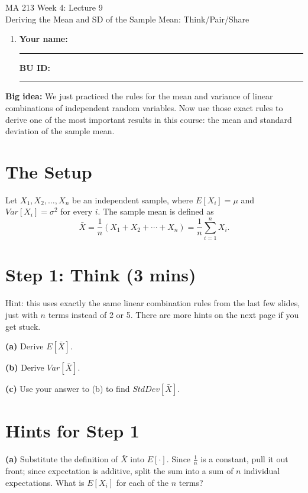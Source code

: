 \documentclass{article}
\newcommand{\coursenumber}{MA 213}
\newcommand{\weekplaceholder}{4}
\newcommand{\lectureplaceholder}{9}
\newcommand{\lecturetitle}{Deriving the Mean and SD of the Sample Mean: Think/Pair/Share}
\newcommand{\nameblank}{\rule{1.75in}{0.4pt}}
\newcommand{\idblank}{\rule{1.55in}{0.4pt}}
\begin{document}
\begin{center}
  {\LARGE \coursenumber{} Week \weekplaceholder{}: Lecture \lectureplaceholder{}}\\
  {\large \lecturetitle{}}
\end{center}

\begin{enumerate}[label=\arabic*.,leftmargin=*,itemsep=.7em]
  \item \textbf{Your name:} \nameblank \hfill \textbf{BU ID:} \idblank
\end{enumerate}

\textbf{Big idea:} We just practiced the rules for the mean and variance of linear combinations of independent random variables. Now use those exact rules to derive one of the most important results in this course: the mean and standard deviation of the sample mean.

\section*{The Setup}

Let $X_1, X_2, \ldots, X_n$ be an independent sample, where $E[X_i] = \mu$ and $Var[X_i] = \sigma^2$ for every $i$. The sample mean is defined as
\[ \bar{X} = \frac{1}{n}\left(X_1 + X_2 + \cdots + X_n\right) = \frac{1}{n}\sum_{i=1}^n X_i. \]

\section*{Step 1: Think (3 mins)}
Hint: this uses exactly the same linear combination rules from the last few slides, just with $n$ terms instead of 2 or 5. There are more hints on the next page if you get stuck.

\textbf{(a)} Derive $E[\bar{X}]$.
\vspace{0.9in}

\textbf{(b)} Derive $Var[\bar{X}]$.
\vspace{0.9in}

\textbf{(c)} Use your answer to (b) to find $StdDev[\bar{X}]$.
\vspace{0.4in}

\newpage
\section*{Hints for Step 1}

\textbf{(a)} Substitute the definition of $\bar X$ into $E[\cdot]$. Since $\frac{1}{n}$ is a constant, pull it out front; since expectation is additive, split the sum into a sum of $n$ individual expectations. What is $E[X_i]$ for each of the $n$ terms?
\end{document}
